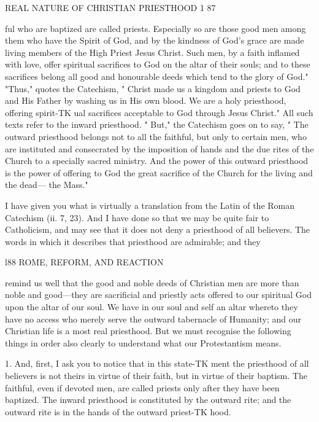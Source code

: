 \documentclass[12pt,a5paper,twoside]{book}
\begin{document}
{REAL NATURE OF CHRISTIAN PRIESTHOOD 1 87 

ful who are baptized are called priests. Especially so 
are those good men among them who have the Spirit 
of God, and by the kindness of God's grace are made 
living members of the High Priest Jesus Christ. Such 
men, by a faith inflamed with love, offer spiritual 
sacrifices to God on the altar of their souls; and to 
these sacrifices belong all good and honourable deeds 
which tend to the glory of God." "Thus," quotes 
the Catechism, " Christ made us a kingdom and 
priests to God and His Father by washing us in His 
own blood. We are a holy priesthood, offering spirit-TK
ual sacrifices acceptable to God through Jesus Christ." 
All such texts refer to the inward priesthood. " But," 
the Catechism goes on to say, " The outward priesthood 
belongs not to all the faithful, but only to certain men, 
who are instituted and consecrated by the imposition 
of hands and the due rites of the Church to a specially 
sacred ministry. And the power of this outward 
priesthood is the power of offering to God the great 
sacrifice of the Church for the living and the dead---
the Mass." 

I have given you what is virtually a translation from 
the Latin of the Roman Catechism (ii. 7, 23). And 
I have done so that we may be quite fair to 
Catholicism, and may see that it does not deny a 
priesthood of all believers. The words in which it 
describes that priesthood are admirable; and they 



l88 ROME, REFORM, AND REACTION 

remind us well that the good and noble deeds of 
Christian men are more than noble and good---they 
are sacrificial and priestly acts offered to our spiritual 
God upon the altar of our soul. We have in our 
soul and self an altar whereto they have no access who 
merely serve the outward tabernacle of Humanity; 
and our Christian life is a most real priesthood. But 
we must recognise the following things in order also 
clearly to understand what our Protestantism means. 

1. And, first, I ask you to notice that in this state-TK
ment the priesthood of all believers is not theirs in 
virtue of their faith, but in virtue of their baptism. 
The faithful, even if devoted men, are called priests 
only after they have been baptized. The inward 
priesthood is constituted by the outward rite; and 
the outward rite is in the hands of the outward priest-TK
hood. 

}
\end{document}
